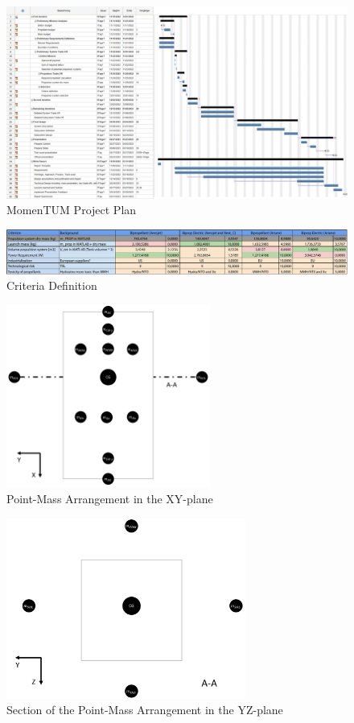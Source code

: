 \begin{figure}
    \centering
    \includegraphics[width=\textwidth]{img/ProjectPlan.png}
    \caption{MomenTUM Project Plan}
    \label{fig:pr-plan}
\end{figure}

\begin{figure}
    \centering
    \includegraphics[width=\textwidth]{pdf/CriteriaDefinition.pdf} 
    \caption{Criteria Definition}
    \label{fig:cr-def}
\end{figure}


\begin{figure}[h] 
  \centering
  \includegraphics[width=0.6\textwidth]{img/pointmass_XY.jpg}
  \caption{Point-Mass Arrangement in the XY-plane}
  \label{fig:araxy}
\end{figure}

\begin{figure}[h]
  \centering
  \includegraphics[width=0.7\textwidth]{img/pointmass_YZ.jpg}
  \caption{Section of the Point-Mass Arrangement in the YZ-plane}
  \label{fig:arayz}
\end{figure}